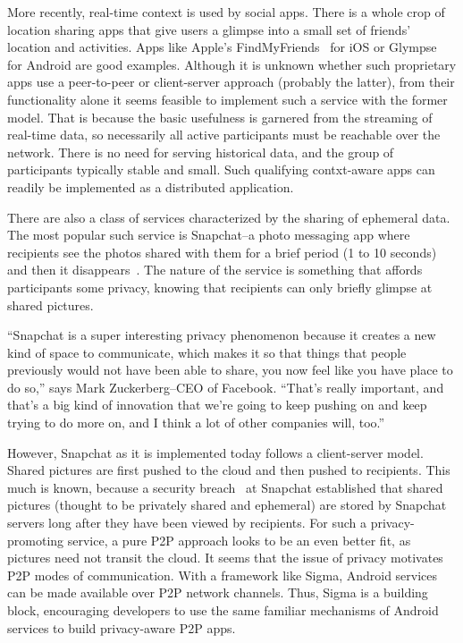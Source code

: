 \documentclass[prodmode]{acmlarge}
\begin{document}
More recently, real-time context is used by social apps. There is a whole crop of location sharing apps that give users a glimpse into a small set of friends' location and activities. Apps like Apple's FindMyFriends~\cite{FindMyFriends} for iOS or Glympse~\cite{Glympse} for Android are good examples. Although it is unknown whether such proprietary apps use a peer-to-peer or client-server approach (probably the latter), from their functionality alone it seems feasible to implement such a service with the former model. That is because the basic usefulness is garnered from the streaming of real-time data, so necessarily all active participants must be reachable over the network. There is no need for serving historical data, and the group of participants typically stable and small. Such qualifying contxt-aware apps can readily be implemented as a distributed application.

There are also a class of services characterized by the sharing of ephemeral data. The most popular such service is Snapchat--a photo messaging app where recipients see the photos shared with them for a brief period (1 to 10 seconds) and then it disappears~\cite{Snapchat}. The nature of the service is something that affords participants some privacy, knowing that recipients can only briefly glimpse at shared pictures.

``Snapchat is a super interesting privacy phenomenon because it creates a new kind of space to communicate, which makes it so that things that people previously would not have been able to share, you now feel like you have place to do so,'' says Mark Zuckerberg--CEO of Facebook. ``That's really important, and that's a big kind of innovation that we're going to keep pushing on and keep trying to do more on, and I think a lot of other companies will, too.''~\cite{Zuckerberg}

However, Snapchat as it is implemented today follows a client-server model. Shared pictures are first pushed to the cloud and then pushed to recipients. This much is known, because a security breach~\cite{SnapchatHack} at Snapchat established that shared pictures (thought to be privately shared and ephemeral) are stored by Snapchat servers long after they have been viewed by recipients. For such a privacy-promoting service, a pure P2P approach looks to be an even better fit, as pictures need not transit the cloud. It seems that the issue of privacy motivates P2P modes of communication. With a framework like Sigma, Android services can be made available over P2P network channels. Thus, Sigma is a building block, encouraging developers to use the same familiar mechanisms of Android services to build privacy-aware P2P apps.
\end{document}
